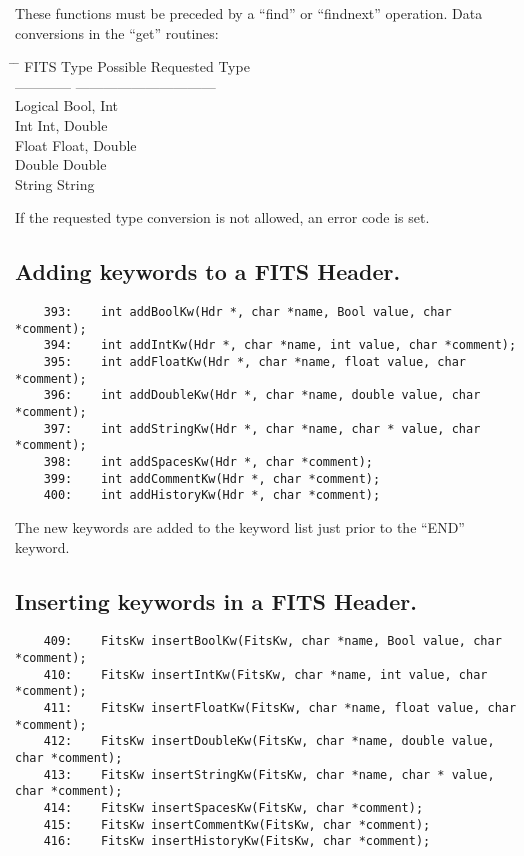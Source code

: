 These functions must be preceded by a ``find'' or ``findnext'' operation.
Data conversions in the ``get'' routines:

\begin{tabbing}
\null \hspace{0.5in} \= \hspace{1.5in} \= \kill
\> FITS Type	\> Possible Requested Type \\
\> ------------ \>------------------------------ \\
\> Logical	\> Bool, Int \\
\> Int		\> Int, Double \\
\> Float	\> Float, Double \\
\> Double	\> Double \\
\> String	\> String
\end{tabbing}

If the requested type conversion is not allowed, an error code is set.

\subsection{ Adding keywords to a FITS Header. }

\begin{scriptsize}
\begin{verbatim}
    393:    int addBoolKw(Hdr *, char *name, Bool value, char *comment);
    394:    int addIntKw(Hdr *, char *name, int value, char *comment);
    395:    int addFloatKw(Hdr *, char *name, float value, char *comment);
    396:    int addDoubleKw(Hdr *, char *name, double value, char *comment);
    397:    int addStringKw(Hdr *, char *name, char * value, char *comment);
    398:    int addSpacesKw(Hdr *, char *comment);
    399:    int addCommentKw(Hdr *, char *comment);
    400:    int addHistoryKw(Hdr *, char *comment);
\end{verbatim}
\end{scriptsize}

The new keywords are added to the keyword list just prior to the
``END'' keyword.

\subsection{ Inserting keywords in a FITS Header. }

\begin{scriptsize}
\begin{verbatim}
    409:    FitsKw insertBoolKw(FitsKw, char *name, Bool value, char *comment);
    410:    FitsKw insertIntKw(FitsKw, char *name, int value, char *comment);
    411:    FitsKw insertFloatKw(FitsKw, char *name, float value, char *comment);
    412:    FitsKw insertDoubleKw(FitsKw, char *name, double value, char *comment);
    413:    FitsKw insertStringKw(FitsKw, char *name, char * value, char *comment);
    414:    FitsKw insertSpacesKw(FitsKw, char *comment);
    415:    FitsKw insertCommentKw(FitsKw, char *comment);
    416:    FitsKw insertHistoryKw(FitsKw, char *comment);
\end{verbatim}
\end{scriptsize}

